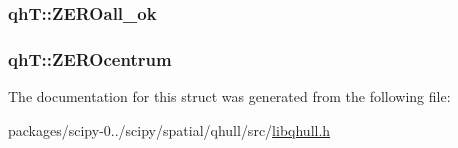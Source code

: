 \subsubsection[{Z\+E\+R\+Oall\+\_\+ok}]{ qh\+T\+::\+Z\+E\+R\+Oall\+\_\+ok}\label{structqhT_ad69d4a14277fc35527be3f50ccecbe6f}
\hypertarget{structqhT_aa70cb9797d22a5182b6ca3ce03e92cf7}{}
\subsubsection[{Z\+E\+R\+Ocentrum}]{ qh\+T\+::\+Z\+E\+R\+Ocentrum}\label{structqhT_aa70cb9797d22a5182b6ca3ce03e92cf7}


The documentation for this struct was generated from the following file\+:\begin{DoxyCompactItemize}
\item 
packages/scipy-\/0../scipy/spatial/qhull/src/\hyperlink{libqhull_8h}{libqhull.\+h}\end{DoxyCompactItemize}
